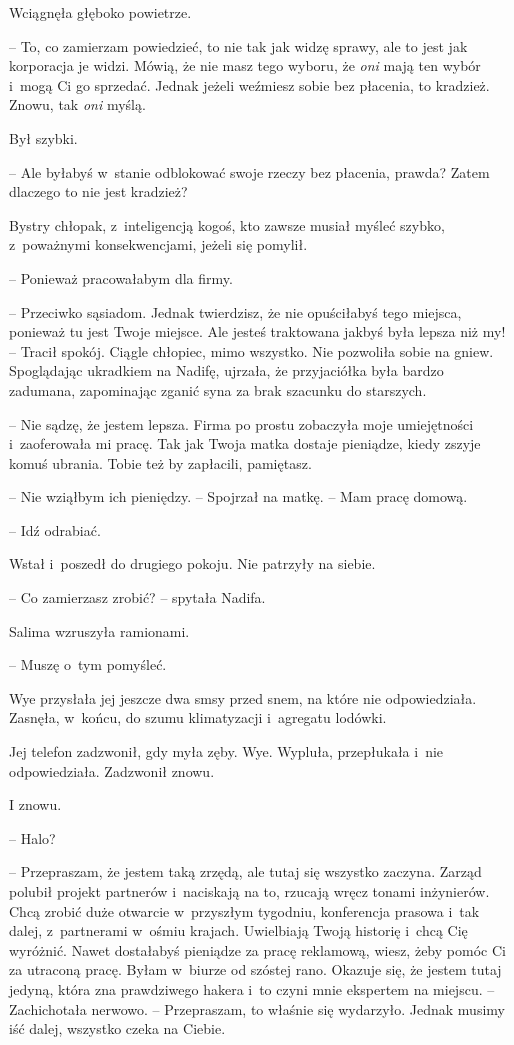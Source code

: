 \documentclass[oneside,polish,11pt,sfheadings]{mwbk}
\begin{document}
Wciągnęła głęboko powietrze. 

-- To, co zamierzam powiedzieć, to nie tak
jak widzę sprawy, ale to jest jak korporacja je widzi. Mówią, że nie
masz tego wyboru, że \textit{oni} mają ten wybór i~mogą Ci go sprzedać.
Jednak jeżeli weźmiesz sobie bez płacenia, to kradzież. Znowu, tak
\textit{oni} myślą.

Był szybki. 

-- Ale byłabyś w~stanie odblokować swoje rzeczy bez płacenia,
prawda? Zatem dlaczego to nie jest kradzież?

Bystry chłopak, z~inteligencją kogoś, kto zawsze musiał myśleć szybko, z~poważnymi konsekwencjami, jeżeli się pomylił. 

-- Ponieważ pracowałabym
dla firmy.

-- Przeciwko sąsiadom. Jednak twierdzisz, że nie opuściłabyś tego
miejsca, ponieważ tu jest Twoje miejsce. Ale jesteś traktowana jakbyś
była lepsza niż my! -- Tracił spokój. Ciągle chłopiec, mimo wszystko. Nie
pozwoliła sobie na gniew. Spoglądając ukradkiem na Nadifę, ujrzała, że
przyjaciółka była bardzo zadumana, zapominając zganić syna za brak
szacunku do starszych.

-- Nie sądzę, że jestem lepsza. Firma po prostu zobaczyła moje
umiejętności i~zaoferowała mi pracę. Tak jak Twoja matka dostaje
pieniądze, kiedy zszyje komuś ubrania. Tobie też by zapłacili,
pamiętasz.

-- Nie wziąłbym ich pieniędzy. -- Spojrzał na matkę. -- Mam pracę domową.

-- Idź odrabiać.

Wstał i~poszedł do drugiego pokoju. Nie patrzyły na siebie. 

-- Co
zamierzasz zrobić? -- spytała Nadifa.

Salima wzruszyła ramionami. 

-- Muszę o~tym pomyśleć.

Wye przysłała jej jeszcze dwa smsy przed snem, na które nie
odpowiedziała. Zasnęła, w~końcu, do szumu klimatyzacji i~agregatu
lodówki.

Jej telefon zadzwonił, gdy myła zęby. Wye. Wypluła, przepłukała i~nie
odpowiedziała. Zadzwonił znowu.

I znowu.

-- Halo?

-- Przepraszam, że jestem taką zrzędą, ale tutaj się wszystko zaczyna.
Zarząd polubił projekt partnerów i~naciskają na to, rzucają wręcz tonami
inżynierów. Chcą zrobić duże otwarcie w~przyszłym tygodniu, konferencja
prasowa i~tak dalej, z~partnerami w~ośmiu krajach. Uwielbiają Twoją
historię i~chcą Cię wyróżnić. Nawet dostałabyś pieniądze za pracę
reklamową, wiesz, żeby pomóc Ci za utraconą pracę. Byłam w~biurze od
szóstej rano. Okazuje się, że jestem tutaj jedyną, która zna prawdziwego
hakera i~to czyni mnie ekspertem na miejscu. -- Zachichotała nerwowo. -- Przepraszam, to właśnie się wydarzyło. Jednak musimy iść dalej, wszystko
czeka na Ciebie.
\end{document}
